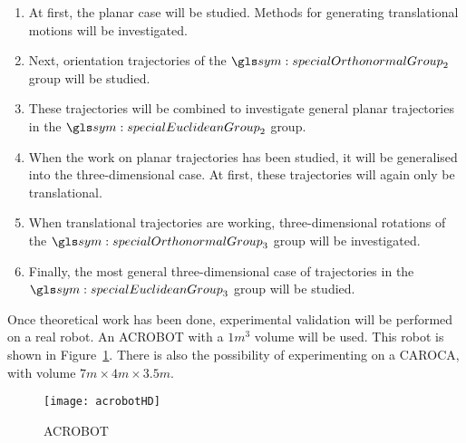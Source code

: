 		\begin{enumerate}

			\item

				At first, the planar case will be studied. Methods for
				generating translational motions will be investigated.

			\item

				Next, orientation trajectories of the
				$\specialOrthonormalGroup{2}$ group will be studied.

			\item

				These trajectories will be combined to investigate general
				planar trajectories in the $\specialEuclideanGroup{2}$ group.

			\item

				When the work on planar trajectories has been studied, it will
				be generalised into the three-dimensional case. At first, these
				trajectories will again only be translational.

			\item

				When translational trajectories are working, three-dimensional
				rotations of the $\specialOrthonormalGroup{3}$ group will be
				investigated.

			\item

				Finally, the most general three-dimensional case of trajectories
				in the $\specialEuclideanGroup{3}$ group will be studied.

		\end{enumerate}

		Once theoretical work has been done, experimental validation will be
		performed on a real robot. An ACROBOT with a $1m^3$ volume  will be
		used. This robot is shown in Figure~\ref{fig:acrobot}. There is also the
		possibility of experimenting on a CAROCA, with volume
		$7m\times4m\times3.5m$.

		\begin{figure}[hb]
			\centering
			\texttt{[image: acrobotHD]}
			\caption{ACROBOT}
			\label{fig:acrobot}
		\end{figure}
